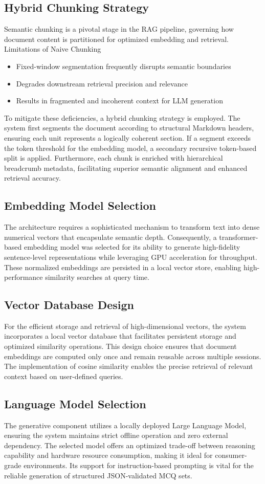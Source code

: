 \documentclass[12pt,a4paper]{report}
\begin{document}
\subsection{Hybrid Chunking Strategy}
Semantic chunking is a pivotal stage in the RAG pipeline, governing how document content is partitioned for optimized embedding and retrieval.
Limitations of Naive Chunking
\begin{itemize}
\item Fixed-window segmentation frequently disrupts semantic boundaries
\item Degrades downstream retrieval precision and relevance
\item Results in fragmented and incoherent context for LLM generation
\end{itemize}
To mitigate these deficiencies, a hybrid chunking strategy is employed. The system first segments the document according to structural Markdown headers, ensuring each unit represents a logically coherent section. If a segment exceeds the token threshold for the embedding model, a secondary recursive token-based split is applied. Furthermore, each chunk is enriched with hierarchical breadcrumb metadata, facilitating superior semantic alignment and enhanced retrieval accuracy.
\subsection{Embedding Model Selection}
The architecture requires a sophisticated mechanism to transform text into dense numerical vectors that encapsulate semantic depth. Consequently, a transformer-based embedding model was selected for its ability to generate high-fidelity sentence-level representations while leveraging GPU acceleration for throughput. These normalized embeddings are persisted in a local vector store, enabling high-performance similarity searches at query time.
\subsection{Vector Database Design}
For the efficient storage and retrieval of high-dimensional vectors, the system incorporates a local vector database that facilitates persistent storage and optimized similarity operations. This design choice ensures that document embeddings are computed only once and remain reusable across multiple sessions. The implementation of cosine similarity enables the precise retrieval of relevant context based on user-defined queries.
\subsection{Language Model Selection}
The generative component utilizes a locally deployed Large Language Model, ensuring the system maintains strict offline operation and zero external dependency. The selected model offers an optimized trade-off between reasoning capability and hardware resource consumption, making it ideal for consumer-grade environments. Its support for instruction-based prompting is vital for the reliable generation of structured JSON-validated MCQ sets.
\end{document}
